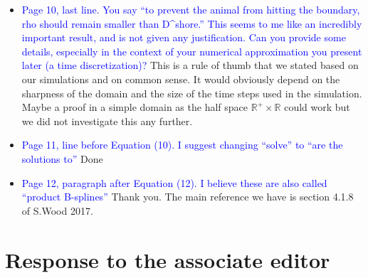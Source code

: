 \documentclass{amsart}
\theoremstyle{plain}
\theoremstyle{remark}
\newcommand {\R}{\mathbb{R}}
\newcommand {\1}{\mathbb{1}}
\begin{document}
\begin{itemize}
    \item \textcolor{blue}{Page 10, last line.  You say “to prevent the animal from hitting the boundary, rho should remain smaller than D^shore.”  This seems to me like an incredibly important result, and is not given any justification.  Can you provide some details, especially in the context of your numerical approximation you present later (a time discretization)?}
    This is a rule of thumb that we stated based on our simulations and on common sense. It would obviously depend on the sharpness of the domain and the size of the time steps used in the simulation. Maybe a proof in a simple domain as the half space $\R^+ \times \R$ could work but we did not investigate this any further.

    \item \textcolor{blue}{Page 11, line before Equation (10).  I suggest changing “solve” to “are the solutions to”} Done

    \item \textcolor{blue}{Page 12, paragraph after Equation (12).  I believe these are also called “product B-splines” } Thank you. The main reference we have is section 4.1.8 of S.Wood 2017.
\end{itemize}



\section{Response to the associate editor}
\end{document}
